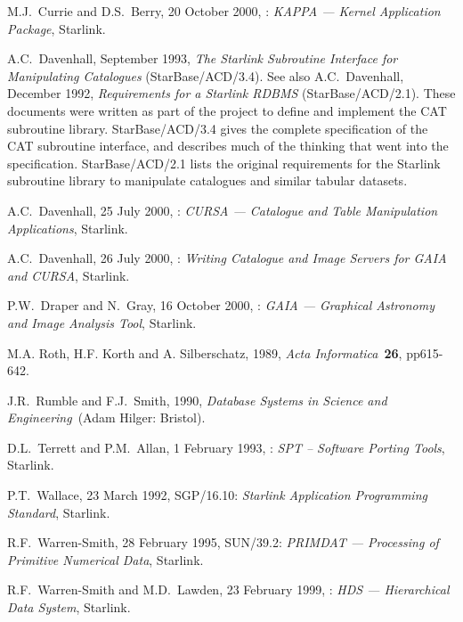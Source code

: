 % 

\newpage
{}
\begin{thebibliography}{99}

   M.J.~Currie and D.S.~Berry, 20 October 2000,
   : {\it KAPPA --- Kernel Application Package},
    Starlink.

   A.C.~Davenhall, September 1993, {\it The Starlink
   Subroutine Interface for Manipulating Catalogues}\/ (StarBase/ACD/3.4).
   See also A.C.~Davenhall, December 1992, {\it Requirements for a
   Starlink RDBMS}\/ (StarBase/ACD/2.1).
   These documents were written as part of the project to define
   and implement the CAT subroutine library.  StarBase/ACD/3.4 gives the
   complete specification of the CAT subroutine interface, and describes
   much of the thinking that went into the specification.
   StarBase/ACD/2.1 lists the original requirements for the Starlink
   subroutine library to manipulate catalogues and similar tabular
   datasets.

   A.C.~Davenhall, 25 July 2000,
   : {\it CURSA --- Catalogue and Table
    Manipulation Applications}, Starlink.

   A.C.~Davenhall, 26 July 2000,
   : {\it Writing Catalogue and Image Servers for
   GAIA and CURSA}, Starlink.

   P.W.~Draper and N.~Gray, 16 October 2000,
   : {\it GAIA --- Graphical Astronomy and
   Image Analysis Tool}, Starlink.

   M.A. Roth, H.F. Korth and A. Silberschatz, 1989, {\it
   Acta Informatica}\, {\bf 26}, pp615-642.

   J.R.~Rumble and F.J.~Smith, 1990, {\it Database
   Systems in Science and Engineering}\, (Adam Hilger: Bristol).

   D.L.~Terrett and P.M.~Allan, 1 February 1993,
   : {\it SPT -- Software Porting Tools},
   Starlink.

   P.T.~Wallace, 23 March 1992, SGP/16.10: {\it
   Starlink Application Programming Standard}, Starlink.

   R.F.~Warren-Smith, 28 February 1995,
   SUN/39.2: {\it PRIMDAT --- Processing of Primitive Numerical Data},
   Starlink.

   R.F.~Warren-Smith and M.D.~Lawden, 23 February 1999,
   : {\it HDS --- Hierarchical Data System},
   Starlink.

\end{thebibliography}

\typeout{  }
\typeout{*****************************************************}
\typeout{  }
\typeout{  }
\typeout{*****************************************************}
\typeout{  }



